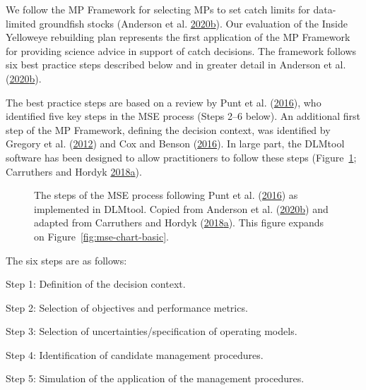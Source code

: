 \documentclass[11pt]{book}
\begin{document}
We follow the MP Framework for selecting MPs to set catch limits for data-limited groundfish stocks (Anderson et al. \protect\hyperlink{ref-anderson2020gfmp}{2020}\protect\hyperlink{ref-anderson2020gfmp}{b}). Our evaluation of the Inside Yelloweye rebuilding plan represents the first application of the MP Framework for providing science advice in support of catch decisions. The framework follows six best practice steps described below and in greater detail in Anderson et al. (\protect\hyperlink{ref-anderson2020gfmp}{2020}\protect\hyperlink{ref-anderson2020gfmp}{b}).

The best practice steps are based on a review by Punt et al. (\protect\hyperlink{ref-punt2016}{2016}), who identified five key steps in the MSE process (Steps 2--6 below). An additional first step of the MP Framework, defining the decision context, was identified by Gregory et al. (\protect\hyperlink{ref-gregory2012}{2012}) and Cox and Benson (\protect\hyperlink{ref-cox2016}{2016}). In large part, the DLMtool software has been designed to allow practitioners to follow these steps (Figure~\ref{fig:mse-chart}; Carruthers and Hordyk \protect\hyperlink{ref-carruthers2018}{2018}\protect\hyperlink{ref-carruthers2018}{a}).


\begin{figure}[htb]

{\centering {} 

}

\caption{The steps of the MSE process following Punt et al. (\protect\hyperlink{ref-punt2016}{2016}) as implemented in DLMtool. Copied from Anderson et al. (\protect\hyperlink{ref-anderson2020gfmp}{2020}\protect\hyperlink{ref-anderson2020gfmp}{b}) and adapted from Carruthers and Hordyk (\protect\hyperlink{ref-carruthers2018}{2018}\protect\hyperlink{ref-carruthers2018}{a}). This figure expands on Figure~\ref{fig:mse-chart-basic}.}\label{fig:mse-chart}
\end{figure}
The six steps are as follows:

Step 1: Definition of the decision context.

Step 2: Selection of objectives and performance metrics.

Step 3: Selection of uncertainties/specification of operating models.

Step 4: Identification of candidate management procedures.

Step 5: Simulation of the application of the management procedures.
\end{document}
